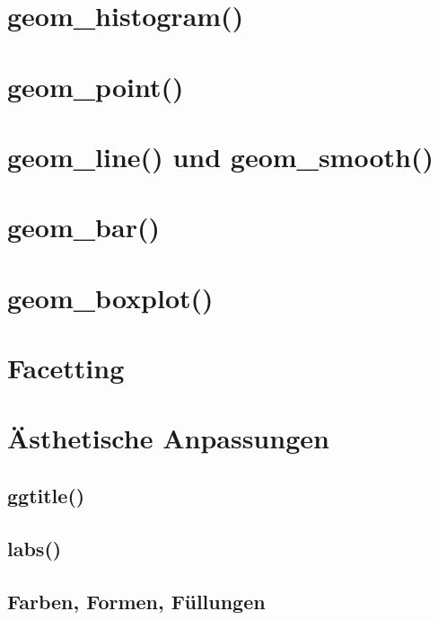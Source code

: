 \documentclass[
]{book}
\begin{document}
\hypertarget{geom_histogram}{%
\section{geom\_histogram()}\label{geom_histogram}}

\hypertarget{geom_point}{%
\section{geom\_point()}\label{geom_point}}

\hypertarget{geom_line-und-geom_smooth}{%
\section{geom\_line() und geom\_smooth()}\label{geom_line-und-geom_smooth}}

\hypertarget{geom_bar}{%
\section{geom\_bar()}\label{geom_bar}}

\hypertarget{geom_boxplot}{%
\section{geom\_boxplot()}\label{geom_boxplot}}

\hypertarget{facetting}{%
\section{Facetting}\label{facetting}}

\hypertarget{uxe4sthetische-anpassungen}{%
\section{Ästhetische Anpassungen}\label{uxe4sthetische-anpassungen}}

\hypertarget{ggtitle}{%
\subsection{ggtitle()}\label{ggtitle}}

\hypertarget{labs}{%
\subsection{labs()}\label{labs}}

\hypertarget{farben-formen-fuxfcllungen}{%
\subsection{Farben, Formen, Füllungen}\label{farben-formen-fuxfcllungen}}
\end{document}
